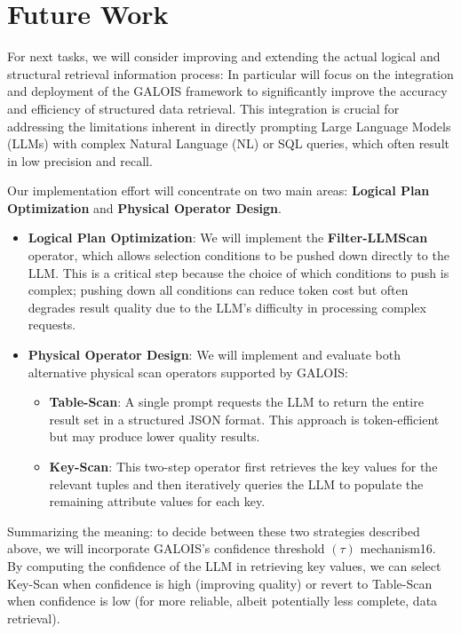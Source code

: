 \section{Future Work}
\label{sec:future_work}
For next tasks, we will consider improving and extending the actual logical and structural retrieval information process:
In particular will focus on the integration and deployment of the GALOIS framework  to significantly improve the accuracy and efficiency of structured data retrieval. 
This integration is crucial for addressing the limitations inherent in directly prompting Large Language Models (LLMs) with complex Natural Language (NL) or SQL queries, which often result in low precision and recall.

Our implementation effort will concentrate on two main areas: \textbf{Logical Plan Optimization
 } and \textbf{Physical Operator Design}.
 \begin{itemize}
    \item \textbf{Logical Plan Optimization}: We will implement the \textbf{Filter-LLMScan} operator, which allows selection conditions to be pushed down directly to the LLM. This is a critical step because the choice of which conditions to push is complex; pushing down all conditions can reduce token cost but often degrades result quality due to the LLM's difficulty in processing complex requests.
    \item \textbf{Physical Operator Design}: We will implement and evaluate both alternative physical scan operators supported by GALOIS:
    \begin{itemize}
        \item \textbf{Table-Scan}: A single prompt requests the LLM to return the entire result set in a structured JSON format. This approach is token-efficient but may produce lower quality results.
        \item \textbf{Key-Scan}: This two-step operator first retrieves the key values for the relevant tuples and then iteratively queries the LLM to populate the remaining attribute values for each key.
    \end{itemize}
 \end{itemize}
 Summarizing the meaning: to decide between these two strategies described above, we will incorporate GALOIS's confidence threshold $(\tau)$ mechanism16. By computing the confidence of the LLM in retrieving key values, we can select Key-Scan when confidence is high (improving quality) or revert to Table-Scan when confidence is low (for more reliable, albeit potentially less complete, data retrieval).


